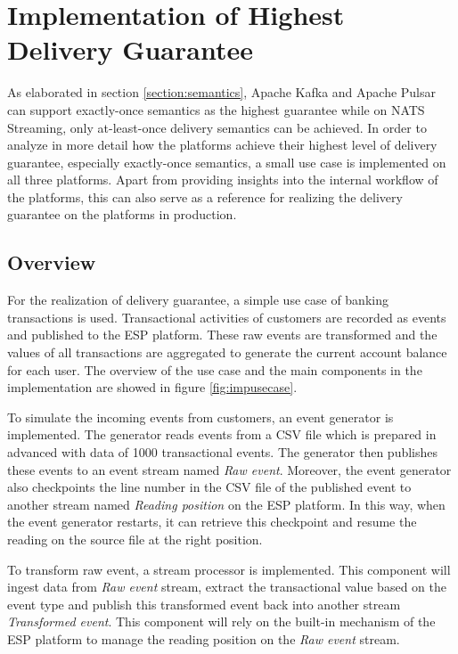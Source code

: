 \chapter{Implementation of Highest Delivery Guarantee} \label{chap:implementation}
As elaborated in section \ref{section:semantics}, Apache Kafka and Apache Pulsar can support exactly-once semantics as the highest guarantee while on NATS Streaming, only at-least-once delivery semantics can be achieved. In order to analyze in more detail how the platforms achieve their highest level of delivery guarantee, especially exactly-once semantics, a small use case is implemented on all three platforms. Apart from providing insights into the internal workflow of the platforms, this can also serve as a reference for realizing the delivery guarantee on the platforms in production. 
\section{Overview}
For the realization of delivery guarantee, a simple use case of banking transactions is used. Transactional activities of customers are recorded as events and published to the ESP platform. These raw events are transformed and the values of all transactions are aggregated to generate the current account balance for each user. The overview of the use case and the main components in the implementation are showed in figure \ref{fig:impusecase}.

To simulate the incoming events from customers, an event generator is implemented. The generator reads events from a CSV file which is prepared in advanced with data of 1000 transactional events. The generator then publishes these events to an event stream named \emph{Raw event}. Moreover, the event generator also checkpoints the line number in the CSV file of the published event to another stream named \emph{Reading position} on the ESP platform. In this way, when the event generator restarts, it can retrieve this checkpoint and resume the reading on the source file at the right position. 

To transform raw event, a stream processor is implemented. This component will ingest data from \emph{Raw event} stream, extract the transactional value based on the event type and publish this transformed event back into another stream \emph{Transformed event}. This component will rely on the built-in mechanism of the ESP platform to manage the reading position on the \emph{Raw event} stream.



